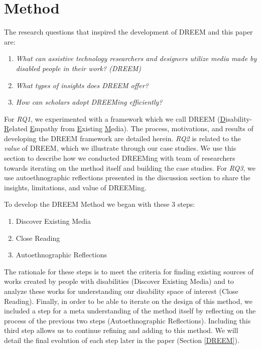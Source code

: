 \section{Method}
The research questions that inspired the development of DREEM and this paper are: 
\begin{enumerate}[label=RQ\arabic*:]
\item \textit{What can assistive technology researchers and designers utilize media made by disabled people in their work? (DREEM)}
\item \textit{What types of insights does DREEM offer?} %
\item \textit{How can scholars adopt DREEMing efficiently?}
\end{enumerate}

For \textit{RQ1}, we experimented with a framework which we call DREEM (\underline{D}isability-\underline{R}elated \underline{E}mpathy from \underline{E}xisting \underline{M}edia). The process, motivations, and results of developing the DREEM framework are detailed herein. 
\textit{RQ2} is related to the \textit{value} of DREEM, which we illustrate through our case studies. We use this section to describe how we conducted DREEMing with team of researchers towards iterating on the method itself and building the case studies. For \textit{RQ3}, we use autoethnographic reflections presented in the discussion section to share the insights, limitations, and value of DREEMing. 

To develop the DREEM Method we began with these 3 steps:
\begin{enumerate}
\item Discover Existing Media
\item Close Reading
\item Autoethnographic Reflections
\end{enumerate}
The rationale for these steps is to meet the criteria for finding existing sources of works created by people with disabilities (Discover Existing Media) and to analyze these works for understanding our disability space of interest (Close Reading). Finally, in order to be able to iterate on the design of this method, we included a step for a meta understanding of the method itself by reflecting on the process of the previous two steps (Autoethnographic Reflections). Including this third step allows us to continue refining and adding to this method. We will detail the final evolution of each step later in the paper (Section \ref{DREEM}).

